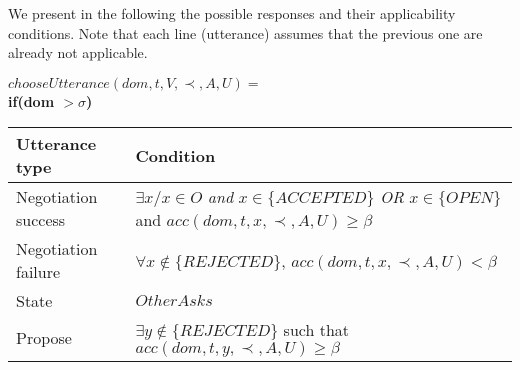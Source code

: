 \documentclass{article}
\begin{document}
	
		We present in the following the possible responses and their applicability conditions. Note that each line (utterance)  assumes that the previous one are already not applicable.
	
	$ chooseUtterance(dom, t, V, \prec, A, U) = $ \\
	\textbf{if(\textbf{dom  $>\sigma$})} \\
	\begin{tabular}{|p{3cm}|p{9cm}|}
		\hline
		\textbf{Utterance type} & Condition \\
		\hline
	 Negotiation success &  $\exists x/ x \in O$  \emph{and} $x \in \{ACCEPTED\}$  \newline \emph{OR} \newline $x \in \{OPEN\}$ and \newline $acc(dom,t,x,\prec,A,U) \geq \beta$ \\
		\hline
		Negotiation failure & $ \forall x \notin \{REJECTED\}$, \newline  $acc(dom,t,x,\prec,A,U) < \beta $ \\
		\hline
		State & $OtherAsks$ \\
		\hline
		Propose & $\exists y \notin \{REJECTED\}$ such that \newline $acc(dom,t,y,\prec,A,U) \geq \beta $  \\
		
	\hline
	\end{tabular}
	\\ \\
		
\end{document}
